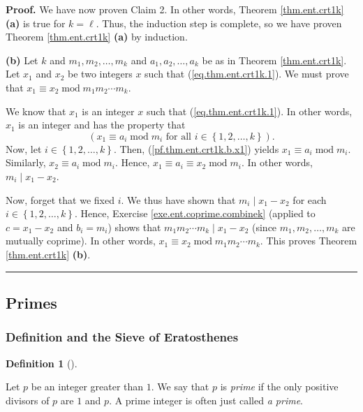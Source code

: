 \documentclass[numbers=enddot,12pt,final,onecolumn,notitlepage]{scrartcl}%
\numberwithin{exer}{subsection}
\theoremstyle{definition}
\newtheorem{defi}[theo]{Definition}
\newenvironment{definition}[1][]
{\begin{defi}[#1]\begin{leftbar}}
{\end{leftbar}\end{defi}}
\newenvironment{proof}[1][Proof]{\noindent\textbf{#1.} }{\ \rule{0.5em}{0.5em}}
\begin{document}
\begin{proof}
We have now proven Claim 2. In other words, Theorem \ref{thm.ent.crt1k}
\textbf{(a)} is true for $k=\ell$. Thus, the induction step is complete, so we
have proven Theorem \ref{thm.ent.crt1k} \textbf{(a)} by induction.

\textbf{(b)} Let $k$ and $m_{1},m_{2},\ldots,m_{k}$ and $a_{1},a_{2}%
,\ldots,a_{k}$ be as in Theorem \ref{thm.ent.crt1k}. Let $x_{1}$ and $x_{2}$
be two integers $x$ such that (\ref{eq.thm.ent.crt1k.1}). We must prove that
$x_{1}\equiv x_{2}\operatorname{mod}m_{1}m_{2}\cdots m_{k}$.

We know that $x_{1}$ is an integer $x$ such that (\ref{eq.thm.ent.crt1k.1}).
In other words, $x_{1}$ is an integer and has the property that%
\begin{equation}
\left(  x_{1}\equiv a_{i}\operatorname{mod}m_{i}\text{ for all }i\in\left\{
1,2,\ldots,k\right\}  \right)  . \label{pf.thm.ent.crt1k.b.x1}%
\end{equation}
Now, let $i\in\left\{  1,2,\ldots,k\right\}  $. Then,
(\ref{pf.thm.ent.crt1k.b.x1}) yields $x_{1}\equiv a_{i}\operatorname{mod}%
m_{i}$. Similarly, $x_{2}\equiv a_{i}\operatorname{mod}m_{i}$. Hence,
$x_{1}\equiv a_{i}\equiv x_{2}\operatorname{mod}m_{i}$. In other words,
$m_{i}\mid x_{1}-x_{2}$.

Now, forget that we fixed $i$. We thus have shown that $m_{i}\mid x_{1}-x_{2}$
for each $i\in\left\{  1,2,\ldots,k\right\}  $. Hence, Exercise
\ref{exe.ent.coprime.combinek} (applied to $c=x_{1}-x_{2}$ and $b_{i}=m_{i}$)
shows that $m_{1}m_{2}\cdots m_{k}\mid x_{1}-x_{2}$ (since $m_{1},m_{2}%
,\ldots,m_{k}$ are mutually coprime). In other words, $x_{1}\equiv
x_{2}\operatorname{mod}m_{1}m_{2}\cdots m_{k}$. This proves Theorem
\ref{thm.ent.crt1k} \textbf{(b)}.
\end{proof}

\subsection{Primes}

\subsubsection{Definition and the Sieve of Eratosthenes}

\begin{definition}
Let $p$ be an integer greater than $1$. We say that $p$ is \textit{prime} if
the only positive divisors of $p$ are $1$ and $p$. A prime integer is often
just called \textit{a prime}.
\end{definition}
\end{document}
